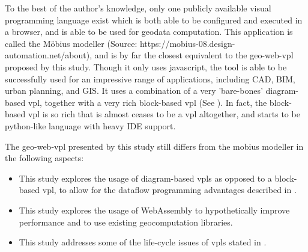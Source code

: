 To the best of the author's knowledge, only one publicly available visual programming language exist which is both able to be configured and executed in a browser, and is able to be used for geodata computation.
This application is called the Möbius modeller (Source: https://mobius-08.design-automation.net/about), and is by far the closest equivalent to the geo-web-vpl proposed by this study.
Though it only uses javascript, the tool is able to be successfully used for an impressive range of applications, including CAD, BIM, urban planning, and GIS. 
It uses a combination of a very 'bare-bones' diagram-based vpl, together with a very rich block-based vpl (See ).
In fact, the block-based vpl is so rich that is almost ceases to be a vpl altogether, and starts to be python-like language with heavy IDE support.  

The \ac{geo-web-vpl} presented by this study still differs from the mobius modeller in the following aspects: 
\begin{itemize}[-]
  \item This study explores the usage of diagram-based vpls as opposed to a block-based vpl, to allow for the dataflow programming advantages described in .
  \item This study explores the usage of WebAssembly to hypothetically improve performance and to use existing geocomputation libraries.
  \item This study addresses some of the life-cycle issues of \ac{vpl}s stated in . 
\end{itemize}


